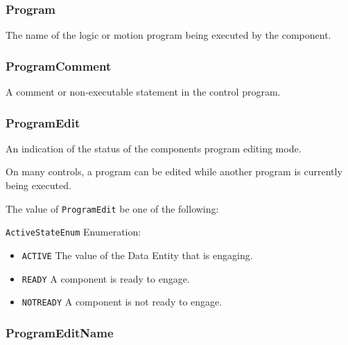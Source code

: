 \subsubsection{Program}
\label{sec:Program}



The name of the logic or motion program being executed by the  component.



\subsubsection{ProgramComment}
\label{sec:ProgramComment}



A comment or non-executable statement in the control program.



\subsubsection{ProgramEdit}
\label{sec:ProgramEdit}



An indication of the status of the  components program editing mode. 

On many controls, a program can be edited while another program is currently being executed.


The value of \texttt{ProgramEdit} \MUST be one of the following: 


\texttt{ActiveStateEnum} Enumeration:

\begin{itemize}
\item \texttt{ACTIVE} \newline The value of the \gls{Data Entity} that is engaging. 
\item \texttt{READY} \newline A component is ready to engage. 
\item \texttt{NOT\textunderscore READY} \newline A component is not ready to engage. 
\end{itemize}



\subsubsection{ProgramEditName}
\label{sec:ProgramEditName}



